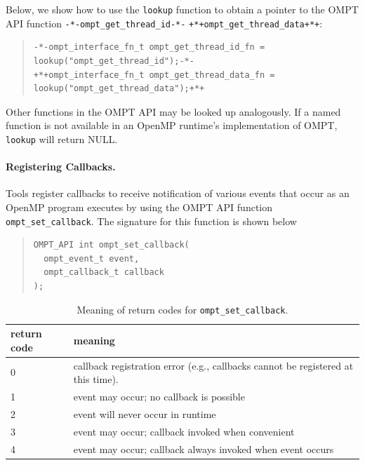 \documentclass{article}
\providecommand{\DIFaddbegin}{} %
\providecommand{\DIFaddend}{} %
\providecommand{\DIFdelbegin}{} %
\providecommand{\DIFdelend}{} %
\begin{document}
Below, we show how to use the \lstinline|lookup| function to obtain a pointer to the OMPT API function \DIFdelbegin \lstinline|-*-ompt_get_thread_id-*-|%
\DIFdelend \DIFaddbegin\lstinline|+*+ompt_get_thread_data+*+|\DIFaddend :

\begin{quote}
\begin{lstlisting}
-*-ompt_interface_fn_t ompt_get_thread_id_fn = lookup("ompt_get_thread_id");-*-
+*+ompt_interface_fn_t ompt_get_thread_data_fn = lookup("ompt_get_thread_data");+*+\end{lstlisting} \end{quote}
Other functions in the OMPT API may be looked up analogously.
If a named function is not available in an OpenMP runtime's implementation of OMPT, \lstinline|lookup| will return NULL.

\paragraph{Registering Callbacks.} 
Tools register callbacks to receive notification of various events that occur as an OpenMP program executes by using the OMPT API function \lstinline|ompt_set_callback|. The signature for this function is shown below{

\begin{quote}
\begin{lstlisting}
OMPT_API int ompt_set_callback(
  ompt_event_t event, 
  ompt_callback_t callback
);
\end{lstlisting}
\end{quote}
}

\begin{table}
\centering
\begin{tabular}{|l|l|}
\hline
return code & meaning \\\hline
0 & callback registration error (e.g., callbacks cannot be registered at this time).\\\hline
1 & event may occur; no callback is possible\\\hline
2 & event will never occur in runtime\\\hline
3 & event may occur; callback invoked when convenient\\\hline
4 & event may occur; callback always invoked when event occurs\\\hline
\end{tabular}
\caption{Meaning of return codes for {\tt ompt\_set\_callback}.}
\label{table:set_rc}
\end{table}
\end{document}
